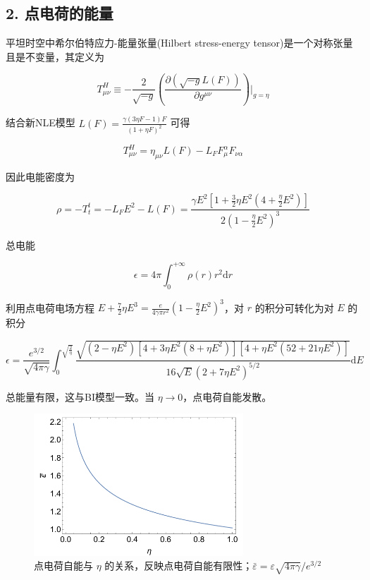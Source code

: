 \documentclass[aps,prl,preprint,groupedaddress,showkeys]{revtex4-2}
\begin{document}
\subsection{2. 点电荷的能量}

平坦时空中希尔伯特应力-能量张量(Hilbert stress-energy tensor)是一个对称张量且是不变量，其定义为

$$
T_{\mu\nu}^H
\equiv -\frac{2 }{\sqrt{-g} } \left(\frac{\partial \left(\sqrt{-g}L(F) \right) }{\partial g^{\mu\nu} }  \right)\bigg|_{g=\eta}
$$

结合新NLE模型 $L(F)=\frac{\gamma(3\eta F-1)F }{(1+\eta F)^2 } $ 可得

$$
T_{\mu\nu}^H
=\eta_{\mu\nu}L(F) - L_FF_\mu^\alpha F_{\nu\alpha}
$$

因此电能密度为

$$
\rho
=-T_t^t
=-L_FE^2-L(F)
=\frac{\gamma E^2\left[1+\frac{3 }{2 } \eta E^2 \left(4+\frac{\eta }{2 } E^2 \right) \right] }{2\left(1-\frac{\eta }{2 } E^2 \right)^3 } 
$$

总电能

$$
\epsilon
=4\pi\int_{0}^{+\infty} \rho(r)r^2\mathrm{d}r
$$

利用点电荷电场方程 $E+\frac{7 }{2 } \eta E^3=\frac{e }{4\gamma \pi r^2 } \left(1-\frac{\eta  }{2 } E^2 \right)^3 $，对 $r$ 的积分可转化为对 $E $ 的积分

$$
\epsilon
=\frac{e^{3/2} }{\sqrt{4\pi\gamma} } \int_{0}^{\sqrt{\frac{2 }{\eta  } }} \frac{\sqrt{\left(2-\eta E^2 \right)\left[4+3\eta E^2\left(8+\eta E^2 \right) \right]\left[4+\eta E^2\left(52+21\eta E^2 \right) \right]} }{16\sqrt{E}\left(2+7\eta E^2 \right)^{5/2} } \mathrm{d}E
$$

总能量有限，这与BI模型一致。当 $\eta\to 0$，点电荷自能发散。

\begin{figure}
    \centering
    \includegraphics[width=0.7\textwidth]{fig/fig3.png}
    \caption{点电荷自能与 $\eta$ 的关系，反映点电荷自能有限性；$\bar{\varepsilon}=\varepsilon\sqrt{4\pi\gamma}/e^{3/2}$}
\end{figure}  
\end{document}
